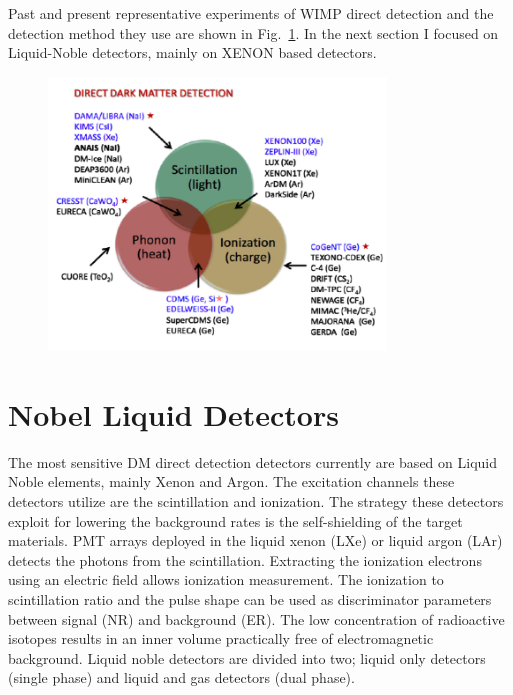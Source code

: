 Past and present representative experiments of WIMP direct detection and the detection method they use are shown in Fig.~\ref{fig:det_strategy}. In the next section I focused on Liquid-Noble detectors, mainly on XENON based detectors.  

\begin{figure}[]
	\centering
	\includegraphics[width=0.8\textwidth]{figs/DetChannels.png}
	\label{fig:det_strategy}
\end{figure}

\section{Nobel Liquid Detectors}
\label{sec:liquidDet}

The most sensitive DM direct detection detectors currently are based on Liquid Noble elements, mainly Xenon and Argon. The excitation channels these detectors utilize are the scintillation and ionization. The strategy these detectors exploit for lowering the background rates is the self-shielding of the target materials. PMT arrays deployed in the liquid xenon (LXe) or liquid argon (LAr) detects the photons from the scintillation. Extracting the ionization electrons using an electric field allows ionization measurement. The ionization to scintillation ratio and the pulse shape can be used as discriminator parameters between signal (NR) and background (ER). The low concentration of radioactive isotopes results in an inner volume practically free of electromagnetic background. Liquid noble detectors are divided into two; liquid only detectors (single phase) and liquid and gas detectors (dual phase).

